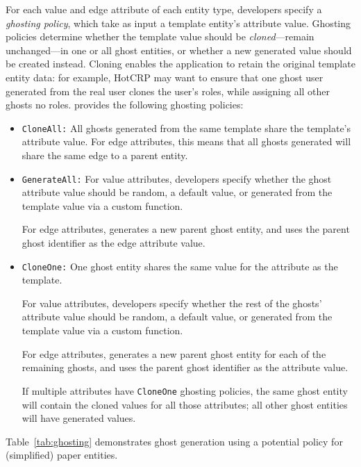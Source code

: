 For each value and edge attribute of each entity type, developers specify a \emph{ghosting policy},
which take as input a template entity's attribute value.  Ghosting policies determine whether the
template value should be \emph{cloned}---remain unchanged---in one or all ghost entities, or whether
a new generated value should be created instead. Cloning enables the application to retain
the original template entity data: for example, HotCRP may want to ensure that one ghost user
generated from the real user clones the user's roles, while assigning all other ghosts no roles.
\sys provides the following ghosting policies:
\begin{itemize}
    \item \texttt{CloneAll:} All ghosts generated from the same template share the template's 
        attribute value. For edge attributes, this means that all ghosts generated will share the
        same edge to a parent entity.

    \item \texttt{GenerateAll:} 
        For value attributes, developers specify whether the ghost attribute value should be
        random, a default value, or generated from the template value via a custom function.
        
        For edge attributes, \sys generates a new parent ghost entity, and uses the parent ghost
        identifier as the edge attribute value.

    \item \texttt{CloneOne:} One ghost entity shares the same value for the attribute as the
        template. 
        
        For value attributes, developers specify whether the rest of the ghosts' attribute value should be
        random, a default value, or generated from the template value via a custom function.

        For edge attributes, \sys generates a new parent ghost entity for each of the remaining
        ghosts, and uses the parent ghost identifier as the attribute value.

        If multiple attributes have \texttt{CloneOne} ghosting policies, the same ghost entity will
        contain the cloned values for all those attributes; all other ghost entities will have
        generated values.
\end{itemize}
Table~\ref{tab:ghosting} demonstrates ghost generation using a potential policy for (simplified) paper entities.

